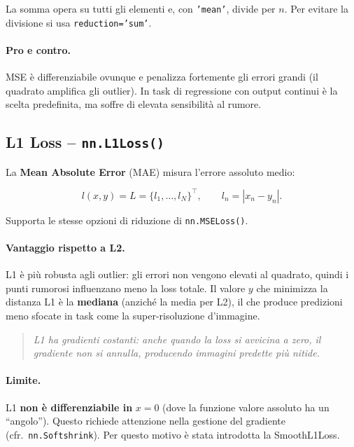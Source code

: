 La somma opera su tutti gli elementi e, con \texttt{'mean'}, divide per $n$.
Per evitare la divisione si usa \texttt{reduction='sum'}.

\paragraph{Pro e contro.}
MSE è differenziabile ovunque e penalizza fortemente gli errori grandi (il quadrato
amplifica gli outlier). In task di regressione con output continui è la scelta
predefinita, ma soffre di elevata sensibilità al rumore.

\subsection{L1 Loss -- \texttt{nn.L1Loss()}}
\label{subsec:l1}

La \textbf{Mean Absolute Error} (MAE) misura l'errore assoluto medio:

\begin{equation}
  l(x, y) = L = \{l_1, \ldots, l_N\}^\top, \qquad
  l_n = |x_n - y_n|.
\end{equation}

Supporta le stesse opzioni di riduzione di \texttt{nn.MSELoss()}.

\paragraph{Vantaggio rispetto a L2.}
L1 è più robusta agli outlier: gli errori non vengono elevati al quadrato, quindi
i punti rumorosi influenzano meno la loss totale. Il valore $y$ che minimizza la
distanza L1 è la \textbf{mediana} (anziché la media per L2), il che produce
predizioni meno sfocate in task come la super-risoluzione d'immagine.

\begin{quote}
\textit{L1 ha gradienti costanti: anche quando la loss si avvicina a zero,
il gradiente non si annulla, producendo immagini predette più nitide.}
\end{quote}

\paragraph{Limite.}
L1 \textbf{non è differenziabile in} $x=0$ (dove la funzione valore assoluto ha
un ``angolo''). Questo richiede attenzione nella gestione del gradiente
(cfr.\ \texttt{nn.Softshrink}). Per questo motivo è stata introdotta la
SmoothL1Loss.


